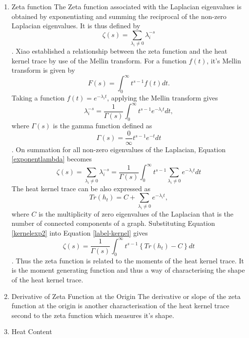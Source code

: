 \documentclass[10pt,a4paper]{article}
\begin{document}
\begin{enumerate}[1]
            \item Zeta function
            The Zeta function associated with the Laplacian eigenvalues is obtained by exponentiating and summing the reciprocal of the non-zero Laplacian eigenvalues. It is thus defined by
            \begin{equation}
            \zeta(s) = \sum_{\lambda_i \neq 0} \lambda_i ^{-s}
            \end{equation}. 
            Xiao \cite{xiao2009graph} established a relationship between the zeta function and the heat kernel trace by use of the Mellin transform. For a function $f(t)$, it's Mellin transform is given by
            \begin{equation}
            F(s) = \int_{0}^{\infty} t^{s-1} f(t) dt.
            \end{equation}
            Taking a function $f(t)=e^{-\lambda_i t}$, applying the Mellin transform gives 
            \begin{equation}
            \lambda_i ^{-s} = \frac{1}{\Gamma(s)} \int_{0}^{\infty} t^{s-1} e^{-\lambda_i t} dt,
            \label{exponentlambda}
            \end{equation}
            where $\Gamma(s)$ is the gamma function defined as 
            \begin{equation}
            \Gamma(s) = \frac{0}{\infty} t^{s-1} e^{-t} dt
            \end{equation}.
            On summation for all non-zero eigenvalues of the Laplacian, Equation \ref{exponentlambda} becomes
            \begin{equation}
            \zeta(s) = \sum_{\lambda_i \neq 0} \lambda_i ^{-s} = \frac{1}{\Gamma(s)} \int_{0}^{\infty} t^{s-1} \sum_{\lambda_i \neq 0} e^{-\lambda_i t} dt
            \label{label-kernel}
            \end{equation}
            The heat kernel trace can be also expressed as 
            \begin{equation}
            Tr(h_t) = C + \sum_{\lambda_i \neq 0} e^{-\lambda_i t}
            \label{kernelexp2},
            \end{equation}
            where $C$ is the multiplicity of zero eigenvalues of the Laplacian that is the number of connected components of a graph.
            Substituting Equation \ref{kernelexp2} into Equation 
            \ref{label-kernel} gives
            \begin{equation}
            \zeta(s) = \frac{1}{\Gamma(s)} \int_{0}^{\infty} t^{s-1} \left \{ Tr(h_t)-C \right \} dt
            \end{equation}.
            Thus the zeta function is related to the moments of the heat kernel trace. It is the moment generating function and thus a way of characterising the shape of the heat kernel trace.
          \item Derivative of Zeta Function at the Origin
        	The derivative or slope of the zeta function at the origin is another characterisation of the heat kernel trace second to the zeta function which measures it's shape.
        	\item Heat Content
        	
        \end{enumerate}
\end{document}
